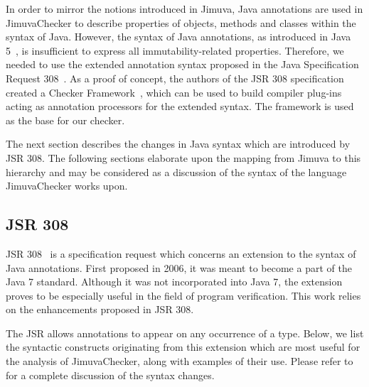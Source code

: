\documentclass{pracamgr}
\theoremstyle{break}
\theoremstyle{break}
\theoremstyle{break}
\begin{document}
In order to mirror the notions introduced in Jimuva, Java annotations
are used in JimuvaChecker to describe properties of objects, methods
and classes within the syntax of Java. However, the syntax of Java
annotations, as introduced in Java 5~\cite{jls3}, is insufficient to
express all immutability-related properties. Therefore, we needed to
use the extended annotation syntax proposed in the Java Specification
Request 308~\cite{jsr308}. As a proof of concept, the authors of the
JSR 308 specification created a Checker Framework~\cite{checkers},
which can be used to build compiler plug-ins acting as annotation
processors for the extended syntax. The framework is used as the base
for our checker.

The next section describes the changes in Java syntax which are
introduced by JSR 308. The following sections elaborate upon the
mapping from Jimuva to this hierarchy and may be considered as a
discussion of the syntax of the language JimuvaChecker works upon.

\subsection{JSR 308}
\label{sec:jsr308}

JSR 308~\cite{jsr308} is a specification request which concerns an
extension to the syntax of Java annotations. First proposed in 2006,
it was meant to become a part of the Java 7 standard. Although it was
not incorporated into Java 7, the extension proves to be especially
useful in the field of program verification. This work relies on the
enhancements proposed in JSR 308.

The JSR allows annotations to appear on any occurrence of a
type. Below, we list the syntactic constructs originating from this
extension which are most useful for the analysis of JimuvaChecker,
along with examples of their use. Please refer to~\cite{jsr308} for a
complete discussion of the syntax changes.
\end{document}

